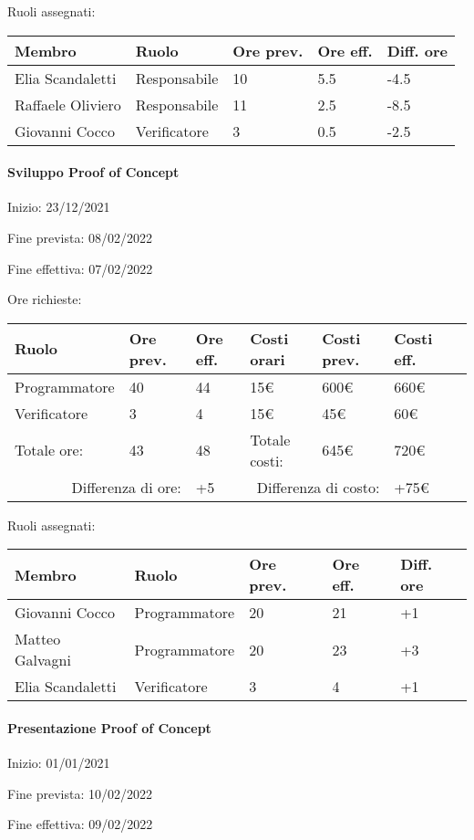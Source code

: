 \documentclass[a4paper, 12pt]{article}
\begin{document}
Ruoli assegnati:\\[0.5em]
\begin{tabular}{|l|l|l|l|l|}\hline
Membro & Ruolo & Ore prev. & Ore eff. & Diff. ore \\\hline
Elia Scandaletti & Responsabile & 10 & 5.5 & -4.5 \\\hline
Raffaele Oliviero & Responsabile & 11 & 2.5 & -8.5 \\\hline
Giovanni Cocco & Verificatore & 3 & 0.5 & -2.5 \\\hline
\end{tabular}

\paragraph{Sviluppo Proof of Concept}
Inizio: 23/12/2021\par
Fine prevista: 08/02/2022\par
Fine effettiva: 07/02/2022

Ore richieste:\\[0.5em]
\begin{tabular}{|l|l|l||l|l|l|l|}\hline
Ruolo & Ore prev. & Ore eff. & Costi orari & Costi prev. & Costi eff.\\\hline
Programmatore & 40 & 44 & 15\euro & 600\euro & 660\euro \\\hline
Verificatore & 3 & 4 & 15\euro & 45\euro & 60\euro \\\hline
Totale ore: & 43 & 48 & Totale costi: & 645\euro & 720\euro \\\hline
\multicolumn{2}{|r|}{Differenza di ore:} & +5 & \multicolumn{2}{r|}{Differenza di costo:} & +75\euro \\\hline
\end{tabular}

Ruoli assegnati:\\[0.5em]
\begin{tabular}{|l|l|l|l|l|}\hline
Membro & Ruolo & Ore prev. & Ore eff. & Diff. ore \\\hline
Giovanni Cocco & Programmatore & 20 & 21 & +1 \\\hline
Matteo Galvagni & Programmatore & 20 & 23 & +3 \\\hline
Elia Scandaletti & Verificatore & 3 & 4 & +1 \\\hline
\end{tabular}

\paragraph{Presentazione Proof of Concept}
Inizio: 01/01/2021\par
Fine prevista: 10/02/2022\par
Fine effettiva: 09/02/2022
\end{document}
